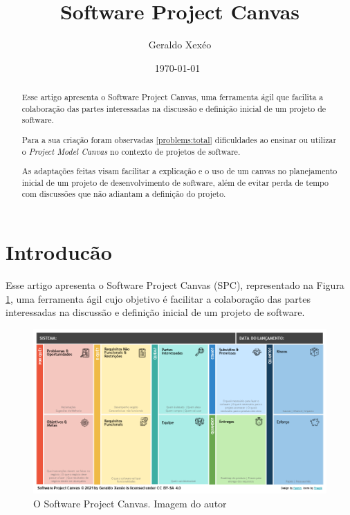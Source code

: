 \documentclass{article}
\title{Software Project Canvas}
\author{Geraldo Xexéo}
\date{\today \ \DTMcurrenttime }
\begin{document}
\maketitle

\begin{abstract}
\hspace*{\parindent}Esse artigo apresenta o Software Project Canvas, uma ferramenta ágil que facilita a colaboração das partes interessadas na  discussão e definição inicial de um projeto de software.

Para a sua  criação foram observadas \ref{problems:total} dificuldades  ao ensinar ou utilizar o \textit{Project Model Canvas} no contexto de projetos de software.

As adaptações feitas visam facilitar a explicação e o uso de um canvas no planejamento inicial de um projeto de desenvolvimento de software, além de evitar perda de tempo com discussões que não adiantam a definição do projeto.
\end{abstract}

\section{Introducão}

Esse artigo apresenta o Software Project Canvas (SPC), representado na Figura \ref{fig:spc}, uma ferramenta ágil cujo objetivo é facilitar a colaboração das partes interessadas na  discussão e definição inicial de um projeto de software.

\begin{figure}[hbt]
    \centering
    \includegraphics[width=\textwidth]{imagens/Software Project Canvas Yasmin 1.png}
    \caption{O Software Project Canvas. Imagem do autor}
    \label{fig:spc}
\end{figure}
\end{document}
